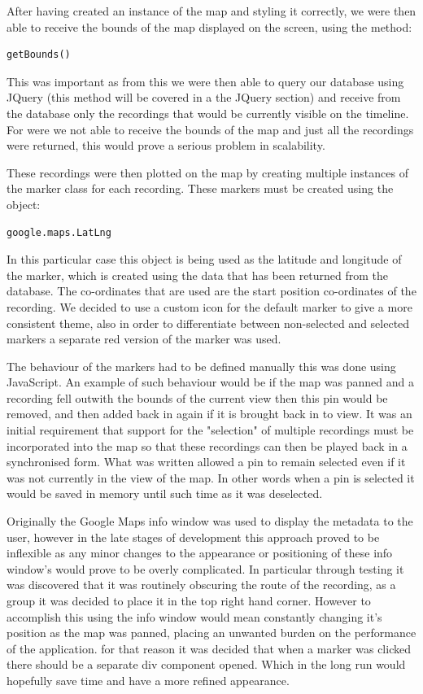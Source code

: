 \documentclass{l3proj}
\begin{document}
After having created an instance of the map and styling it correctly, we were then able to receive the bounds of the map displayed on the screen, using the method:
\begin{verbatim}
getBounds()
\end{verbatim}
This was important as from this we were then able to query our database using JQuery (this method will be covered in a the JQuery section) and receive from the database only the recordings that would be currently visible on the timeline. For were we not able to receive the bounds of the map and just all the recordings were returned, this would prove a serious problem in scalability.

These recordings were then plotted on the map by creating multiple instances of the marker class for each recording. These markers must be created using the object:
\begin{verbatim}
google.maps.LatLng
\end{verbatim}
In this particular case this object is being used as the latitude and longitude of the marker, which is created using the data that has been returned from the database. The co-ordinates that are used are the start position co-ordinates of the recording. We decided to use a custom icon for the default marker to give a more consistent theme, also in order to differentiate between non-selected and selected markers a separate red version of the marker was used.

The behaviour of the markers had to be defined manually this was done using JavaScript. An example of such behaviour would be if the map was panned and a recording fell outwith the bounds of the current view then this pin would be removed, and then added back in again if it is brought back in to view. It was an initial requirement that support for the "selection" of multiple recordings must be incorporated into the map so that these recordings can then be played back in a synchronised form. What was written allowed a pin to remain selected even if it was not currently in the view of the map. In other words when a pin is selected it would be saved in memory until such time as it was deselected.

Originally the Google Maps info window was used to display the metadata to the user, however in the late stages of development this approach proved to be inflexible as any minor changes to the appearance or positioning of these info window’s would prove to be overly complicated. In particular through testing it was discovered that it was routinely obscuring the route of the recording, as a group it was decided to place it in the top right hand corner. However to accomplish this using the info window would mean constantly changing it's position as the map was panned, placing an unwanted burden on the performance of the application. for that reason it was decided that when a marker was clicked there should be a separate div component opened. Which in the long run would hopefully save time and have a more refined appearance.
\end{document}
